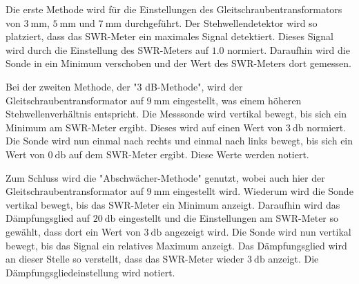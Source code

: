 Die erste Methode wird für die Einstellungen des Gleitschraubentransformators von $\SI{3}{\milli\metre}$, $\SI{5}{\milli\metre}$ und $\SI{7}{\milli\metre}$ durchgeführt.
Der Stehwellendetektor wird so platziert, dass das SWR-Meter ein maximales Signal detektiert.
Dieses Signal wird durch die Einstellung des SWR-Meters auf $\num{1.0}$ normiert.
Daraufhin wird die Sonde in ein Minimum verschoben und der Wert des SWR-Meters dort gemessen.

Bei der zweiten Methode, der "3 dB-Methode", wird der Gleitschraubentransformator auf $\SI{9}{\milli\metre}$ eingestellt, was einem höheren Stehwellenverhältnis entspricht.
Die Messsonde wird vertikal bewegt, bis sich ein Minimum am SWR-Meter ergibt.
Dieses wird auf einen Wert von $\SI{3}{\decibel}$ normiert.
Die Sonde wird nun einmal nach rechts und einmal nach links bewegt, bis sich ein Wert von $\SI{0}{\decibel}$ auf dem SWR-Meter ergibt.
Diese Werte werden notiert.

Zum Schluss wird die "Abschwächer-Methode" genutzt, wobei auch hier der Gleitschraubentransformator auf $\SI{9}{\milli\metre}$ eingestellt wird.
Wiederum wird die Sonde vertikal bewegt, bis das SWR-Meter ein Minimum anzeigt.
Daraufhin wird das Dämpfungsglied auf $\SI{20}{\decibel}$ eingestellt und die Einstellungen am SWR-Meter so gewählt, dass dort ein Wert von $\SI{3}{\decibel}$ angezeigt wird.
Die Sonde wird nun vertikal bewegt, bis das Signal ein relatives Maximum anzeigt.
Das Dämpfungsglied wird an dieser Stelle so verstellt, dass das SWR-Meter wieder $\SI{3}{\decibel}$ anzeigt.
Die Dämpfungsgliedeinstellung wird notiert.
